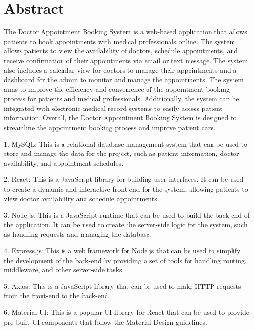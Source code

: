 \chapter*{Abstract}%
%

The Doctor Appointment Booking System is a web-based application that allows patients to book appointments with medical professionals online. The system allows patients to view the availability of doctors, schedule appointments, and receive confirmation of their appointments via email or text message. The system also includes a calendar view for doctors to manage their appointments and a dashboard for the admin to monitor and manage the appointments. The system aims to improve the efficiency and convenience of the appointment booking process for patients and medical professionals. Additionally, the system can be integrated with electronic medical record systems to easily access patient information. Overall, the Doctor Appointment Booking System is designed to streamline the appointment booking process and improve patient care.

1. MySQL: This is a relational database management system that can be used to store and manage the data for the project, such as patient information, doctor availability, and appointment schedules.

2. React: This is a JavaScript library for building user interfaces. It can be used to create a dynamic and interactive front-end for the system, allowing patients to view doctor availability and schedule appointments.

3. Node.js: This is a JavaScript runtime that can be used to build the back-end of the application. It can be used to create the server-side logic for the system, such as handling requests and managing the database.

4. Express.js: This is a web framework for Node.js that can be used to simplify the development of the back-end by providing a set of tools for handling routing, middleware, and other server-side tasks.

5. Axios: This is a JavaScript library that can be used to make HTTP requests from the front-end to the back-end.

6. Material-UI: This is a popular UI library for React that can be used to provide pre-built UI components that follow the Material Design guidelines.

